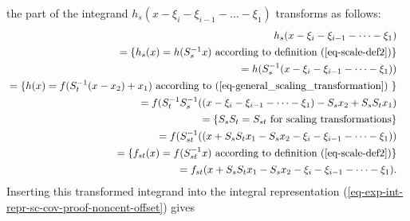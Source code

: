 \documentclass[twocolumn,runningheads]{svjour3}
\begin{document}
the part of the integrand 
$h_s(x - \xi_i - \xi_{i-1} - \dots -\xi_1)$ transforms as follows:
\begin{align}
\begin{split}
& h_s(x - \xi_i - \xi_{i-1} - \dots - \xi_1)
\end{split}\nonumber\\
\begin{split}
& = \{ \mbox{$h_s(x) = h(S_s^{-1}x)$ according to definition (\ref{eq-scale-def2})}  \}
\end{split}\nonumber\\
\begin{split}
& = h(S_s^{-1} (x - \xi_i - \xi_{i-1} - \dots - \xi_1))
\end{split}\nonumber\\
\begin{split}
& = \{ \mbox{$h(x) = f(S_t^{-1} (x-x_2) + x_1)$ according to (\ref{eq-general_scaling_transformation}) } \}
\end{split}\nonumber\\
\begin{split}
& = f(S_t^{-1} S_s^{-1} ((x - \xi_i - \xi_{i-1} - \dots - \xi_1) - S_s x_2 + S_s S_t x_1)
\end{split}\nonumber\\
\begin{split}
& = \{ \mbox{$S_s S_t = S_{st}$ for scaling transformations} \}
\end{split}\nonumber\\
\begin{split}
& = f(S_{st}^{-1} ((x + S_s S_t x_1 - S_s x_2 - \xi_i - \xi_{i-1} - \dots - \xi_1))
\end{split}\nonumber\\
\begin{split}
& = \{ \mbox{$f_{st}(x) = f(S_{st}^{-1} x)$ according to definition (\ref{eq-scale-def2})} \}
\end{split}\nonumber\\
\begin{split}
& = f_{st}(x + S_s S_t x_1 - S_s x_2 - \xi_i - \xi_{i-1} - \dots - \xi_1).
\end{split}
\end{align}
Inserting this transformed integrand into the integral representation 
(\ref{eq-exp-int-repr-sc-cov-proof-noncent-offset})
gives
\end{document}

